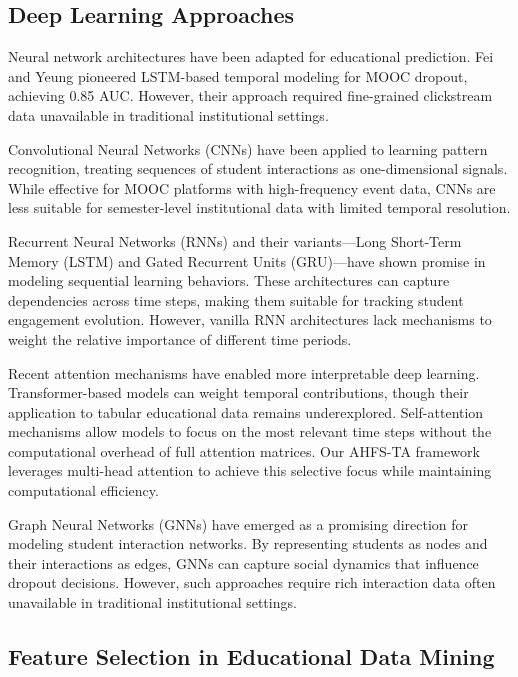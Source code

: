 \documentclass[journal]{IEEEtran}
\begin{document}
\subsection{Deep Learning Approaches}

Neural network architectures have been adapted for educational prediction. Fei and Yeung \cite{fei2015temporal} pioneered LSTM-based temporal modeling for MOOC dropout, achieving 0.85 AUC. However, their approach required fine-grained clickstream data unavailable in traditional institutional settings.

Convolutional Neural Networks (CNNs) have been applied to learning pattern recognition, treating sequences of student interactions as one-dimensional signals. While effective for MOOC platforms with high-frequency event data, CNNs are less suitable for semester-level institutional data with limited temporal resolution.

Recurrent Neural Networks (RNNs) and their variants---Long Short-Term Memory (LSTM) and Gated Recurrent Units (GRU)---have shown promise in modeling sequential learning behaviors. These architectures can capture dependencies across time steps, making them suitable for tracking student engagement evolution. However, vanilla RNN architectures lack mechanisms to weight the relative importance of different time periods.

Recent attention mechanisms have enabled more interpretable deep learning. Transformer-based models \cite{vaswani2017attention} can weight temporal contributions, though their application to tabular educational data remains underexplored. Self-attention mechanisms allow models to focus on the most relevant time steps without the computational overhead of full attention matrices. Our AHFS-TA framework leverages multi-head attention to achieve this selective focus while maintaining computational efficiency.

Graph Neural Networks (GNNs) have emerged as a promising direction for modeling student interaction networks. By representing students as nodes and their interactions as edges, GNNs can capture social dynamics that influence dropout decisions. However, such approaches require rich interaction data often unavailable in traditional institutional settings.

\subsection{Feature Selection in Educational Data Mining}
\end{document}
